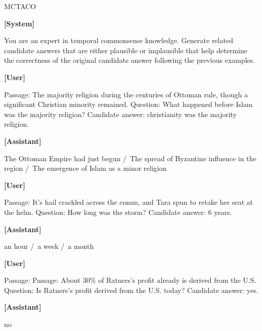 \begin{myColorbox}[]{MCTACO}

\textbf{[System]}

You are an expert in temporal commonsense knowledge. Generate related candidate answers that are either plausible or implausible that help determine the correctness of the original candidate answer following the previous examples.

\textbf{[User]}

Passage: The majority religion during the centuries of Ottoman rule, though a significant Christian minority remained. Question: What happened before Islam was the majority religion? Candidate answer: christianity was the majority religion.

\textbf{[Assistant]}

The Ottoman Empire had just begun /\ The spread of Byzantine influence in the region /\ The emergence of Islam as a minor religion 

\textbf{[User]}

Passage: It's hail crackled across the comm, and Tara spun to retake her seat at the helm. Question: How long was the storm? Candidate answer: 6 years.

\textbf{[Assistant]}

an hour /\ a week /\ a month


\textbf{[User]}

Passage: Passage: About 30\% of Ratners's profit already is derived from the U.S. Question: Is Ratners's profit derived from the U.S. today? Candidate answer: yes.

\textbf{[Assistant]}

no

\end{myColorbox}